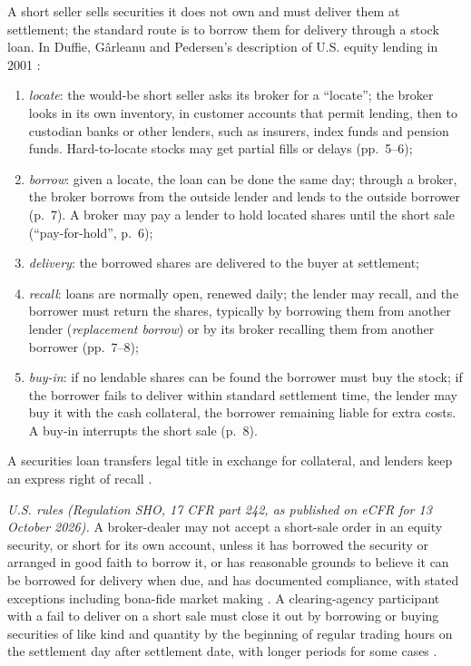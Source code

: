 \begin{qfmechanism}\label{mech:securities-lending-short-sale}
 A short seller sells securities it does not own and must deliver them at settlement; the standard route is to borrow them for delivery through a stock loan. In Duffie, Gârleanu and Pedersen's description of U.S. equity lending in 2001 \citep[sec.~2, pp.~5--8]{al-duffie}:
\begin{enumerate}
\item \emph{locate}: the would-be short seller asks its broker for a ``locate''; the broker looks in its own inventory, in customer accounts that permit lending, then to custodian banks or other lenders, such as insurers, index funds and pension funds. Hard-to-locate stocks may get partial fills or delays (pp.~5--6);
\item \emph{borrow}: given a locate, the loan can be done the same day; through a broker, the broker borrows from the outside lender and lends to the outside borrower (p.~7). A broker may pay a lender to hold located shares until the short sale (``pay-for-hold'', p.~6);
\item \emph{delivery}: the borrowed shares are delivered to the buyer at settlement;
\item \emph{recall}: loans are normally open, renewed daily; the lender may recall, and the borrower must return the shares, typically by borrowing them from another lender (\emph{replacement borrow}) or by its broker recalling them from another borrower (pp.~7--8);
\item \emph{buy-in}: if no lendable shares can be found the borrower must buy the stock; if the borrower fails to deliver within standard settlement time, the lender may buy it with the cash collateral, the borrower remaining liable for extra costs. A buy-in interrupts the short sale (p.~8).
\end{enumerate}
A securities loan transfers legal title in exchange for collateral, and lenders keep an express right of recall \citep[Repo FAQ 13]{al-icma}.

 \emph{U.S. rules (Regulation SHO, 17 CFR part 242, as published on eCFR for 13 October 2026).} A broker-dealer may not accept a short-sale order in an equity security, or short for its own account, unless it has borrowed the security or arranged in good faith to borrow it, or has reasonable grounds to believe it can be borrowed for delivery when due, and has documented compliance, with stated exceptions including bona-fide market making \citep[\S\,242.203(b)]{cfr-242-203}. A clearing-agency participant with a fail to deliver on a short sale must close it out by borrowing or buying securities of like kind and quantity by the beginning of regular trading hours on the settlement day after settlement date, with longer periods for some cases \citep[\S\,242.204(a)]{cfr-242-204}.


\end{qfmechanism}
